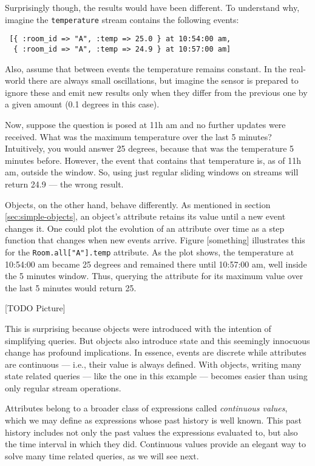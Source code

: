 \documentclass{report}
\begin{document}
Surprisingly though, the results would have been different. To
understand why, imagine the \verb=temperature= stream contains the
following events:

\begin{verbatim}
 [{ :room_id => "A", :temp => 25.0 } at 10:54:00 am,
  { :room_id => "A", :temp => 24.9 } at 10:57:00 am]
\end{verbatim}

Also, assume that between events the temperature remains constant. In
the real-world there are always small oscillations, but imagine the
sensor is prepared to ignore these and emit new results only when they
differ from the previous one by a given amount (0.1 degrees in this
case).

Now, suppose the question is posed at 11h am and no further updates
were received. What was the maximum temperature over the last 5
minutes? Intuitively, you would answer 25 degrees, because that was
the temperature 5 minutes before. However, the event that contains
that temperature is, as of 11h am, outside the window. So, using just
regular sliding windows on streams will return 24.9 --- the wrong
result.

Objects, on the other hand, behave differently. As mentioned in
section \ref{sec:simple-objects}, an object's attribute retains its
value until a new event changes it. One could plot the evolution of an
attribute over time as a step function that changes when new events
arrive. Figure [something] illustrates this for the
\verb=Room.all["A"].temp= attribute. As the plot shows, the
temperature at 10:54:00 am became 25 degrees and remained there until
10:57:00 am, well inside the 5 minutes window. Thus, querying the
attribute for its maximum value over the last 5 minutes would return
25.

[TODO Picture]

This is surprising because objects were introduced with the intention
of simplifying queries. But objects also introduce state and this
seemingly innocuous change has profound implications. In essence,
events are discrete while attributes are continuous --- i.e., their
value is always defined. With objects, writing many state related
queries --- like the one in this example --- becomes easier than using
only regular stream operations.

Attributes belong to a broader class of expressions called
\emph{continuous values}, which we may define as expressions whose
past history is well known. This past history includes not only the
past values the expressions evaluated to, but also the time interval
in which they did. Continuous values provide an elegant way to solve
many time related queries, as we will see next.
\end{document}
